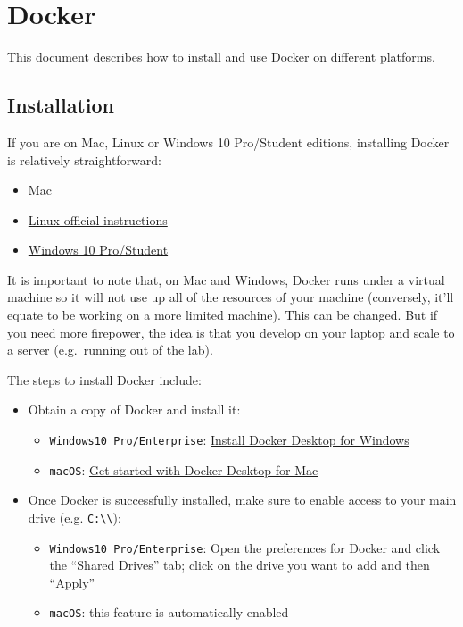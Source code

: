 \documentclass[]{book}
\providecommand{\tightlist}{%
  \setlength{\itemsep}{0pt}\setlength{\parskip}{0pt}}
\begin{document}
\chapter{Docker}\label{docker}

This document describes how to install and use Docker on different
platforms.

\section{Installation}\label{installation}

If you are on Mac, Linux or Windows 10 Pro/Student editions, installing
Docker is relatively straightforward:

\begin{itemize}
\tightlist
\item
  \href{https://docs.docker.com/docker-for-mac/}{Mac}
\item
  \href{https://docs.docker.com/install/linux/docker-ce/ubuntu/}{Linux
  official instructions}
\item
  \href{https://docs.docker.com/docker-for-windows/}{Windows 10
  Pro/Student}
\end{itemize}

It is important to note that, on Mac and Windows, Docker runs under a
virtual machine so it will not use up all of the resources of your
machine (conversely, it'll equate to be working on a more limited
machine). This can be changed. But if you need more firepower, the idea
is that you develop on your laptop and scale to a server (e.g.~running
out of the lab).

The steps to install Docker include:

\begin{itemize}
\tightlist
\item
  Obtain a copy of Docker and install it:

  \begin{itemize}
  \tightlist
  \item
    \texttt{Windows10\ Pro/Enterprise}:
    \href{https://docs.docker.com/docker-for-windows/install/}{Install
    Docker Desktop for Windows}
  \item
    \texttt{macOS}: \href{https://docs.docker.com/docker-for-mac/}{Get
    started with Docker Desktop for Mac}
  \end{itemize}
\item
  Once Docker is successfully installed, make sure to enable access to
  your main drive (e.g. \texttt{C:\textbackslash{}\textbackslash{}}):

  \begin{itemize}
  \tightlist
  \item
    \texttt{Windows10\ Pro/Enterprise}: Open the preferences for Docker
    and click the ``Shared Drives'' tab; click on the drive you want to
    add and then ``Apply''
  \item
    \texttt{macOS}: this feature is automatically enabled
  \end{itemize}
\end{itemize}
\end{document}
